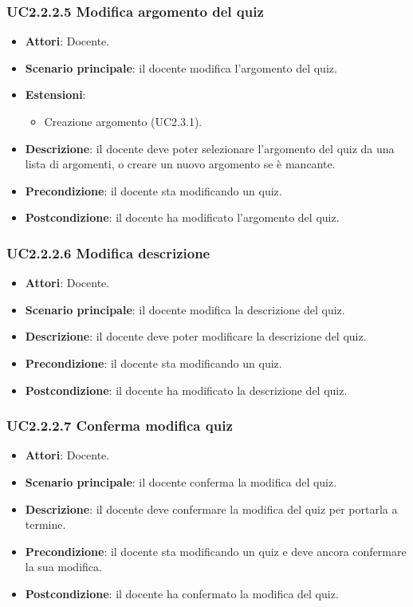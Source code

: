 \subsubsection{UC2.2.2.5 Modifica argomento del quiz}
\begin{itemize}
\item \textbf{Attori}: Docente.
\item \textbf{Scenario principale}: il docente modifica l'argomento del quiz.
\item \textbf{Estensioni}:
\begin{itemize}
\item Creazione argomento (UC2.3.1).
\end{itemize}
\item \textbf{Descrizione}: il docente deve poter selezionare l'argomento del quiz da una lista di argomenti, o creare un nuovo argomento se è mancante.
\item \textbf{Precondizione}: il docente sta modificando un quiz.
\item \textbf{Postcondizione}: il docente ha modificato l'argomento del quiz.
\end{itemize}
\subsubsection{UC2.2.2.6 Modifica descrizione}
\begin{itemize}
\item \textbf{Attori}: Docente.
\item \textbf{Scenario principale}: il docente modifica la descrizione del quiz.
\item \textbf{Descrizione}: il docente deve poter modificare la descrizione del quiz.
\item \textbf{Precondizione}: il docente sta modificando un quiz.
\item \textbf{Postcondizione}: il docente ha modificato la descrizione del quiz.
\end{itemize}
\subsubsection{UC2.2.2.7 Conferma modifica quiz}
\begin{itemize}
\item \textbf{Attori}: Docente.
\item \textbf{Scenario principale}: il docente conferma la modifica del quiz.
\item \textbf{Descrizione}: il docente deve confermare la modifica del quiz per portarla a termine.
\item \textbf{Precondizione}: il docente sta modificando un quiz e deve ancora confermare la sua modifica.
\item \textbf{Postcondizione}: il docente ha confermato la modifica del quiz.
\end{itemize}
